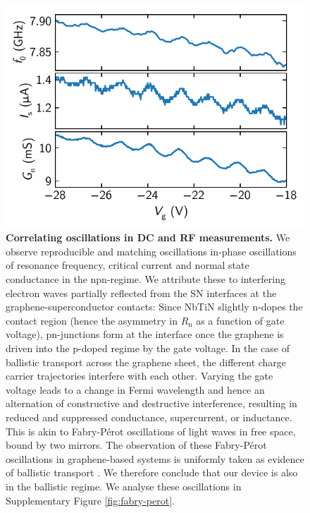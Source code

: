 \begin{figure}[]
	\centering
	\includegraphics[width=.6\linewidth]{chapter-gJJ/figs/si_corr_osc}
	\caption{\textbf{Correlating oscillations in DC and RF measurements.}
		We observe reproducible and matching oscillations in-phase oscillations of resonance frequency, critical current and normal state conductance in the npn-regime.
		We attribute these to interfering electron waves partially reflected from the SN interfaces at the graphene-superconductor contacts:
		Since NbTiN slightly n-dopes the contact region (hence the asymmetry in $R_\text{n}$ as a function of gate voltage), pn-junctions form at the interface once the graphene is driven into the p-doped regime by the gate voltage.
		In the case of ballistic transport across the graphene sheet, the different charge carrier trajectories interfere with each other.
		Varying the gate voltage leads to a change in Fermi wavelength and hence an alternation of constructive and destructive interference, resulting in reduced and suppressed conductance, supercurrent, or inductance.
		This is akin to Fabry-P\'erot oscillations of light waves in free space, bound by two mirrors.
		The observation of these Fabry-P\'erot oscillations in graphene-based systems is uniformly taken as evidence of ballistic transport \cite{liang_fabry_2001,miao_phasecoherent_2007,young_quantum_2009,cho_massless_2011,wu_quantum_2012,campos_quantum_2012,rickhaus_ballistic_2013,benshalom_quantum_2015,calado_ballistic_2015a,amet_supercurrent_2016a,borzenets_ballistic_2016a,allen_observation_2017,zhu_supercurrent_2018}.
		We therefore conclude that our device is also in the ballistic regime.
		We analyse these oscillations in Supplementary Figure \ref{fig:fabry-perot}.
	} 
	\label{fig:quantum_osc}
\end{figure}


